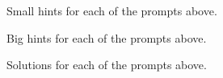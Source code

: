 \begin{activity}




\ea
\end{activity}


\begin{smallhint}
\ba
	\item Small hints for each of the prompts above.
\ea
\end{smallhint}
\begin{bighint}
\ba
	\item Big hints for each of the prompts above.
\ea
\end{bighint}
\begin{activitySolution}
\ba
	\item Solutions for each of the prompts above.
\ea
\end{activitySolution}
\aftera